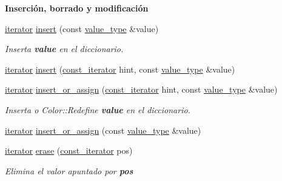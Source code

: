 \begin{Indent}\textbf{ Inserción, borrado y modificación}\par
\begin{DoxyCompactItemize}
\item 
\hyperlink{classaed2_1_1map_1_1iterator}{iterator} \hyperlink{classaed2_1_1map_a60aacba06b1579630b3c8e996cf248c8_a60aacba06b1579630b3c8e996cf248c8}{insert} (const \hyperlink{classaed2_1_1map_a719db98e0ff9a837610f76be33264680_a719db98e0ff9a837610f76be33264680}{value\+\_\+type} \&value)
\begin{DoxyCompactList}\small\item\em Inserta {\bfseries value} en el diccionario. \end{DoxyCompactList}\item 
\hyperlink{classaed2_1_1map_1_1iterator}{iterator} \hyperlink{classaed2_1_1map_a6941cde9a79c27f054b5c97a587a1854_a6941cde9a79c27f054b5c97a587a1854}{insert} (\hyperlink{classaed2_1_1map_1_1const__iterator}{const\+\_\+iterator} hint, const \hyperlink{classaed2_1_1map_a719db98e0ff9a837610f76be33264680_a719db98e0ff9a837610f76be33264680}{value\+\_\+type} \&value)
\item 
\hyperlink{classaed2_1_1map_1_1iterator}{iterator} \hyperlink{classaed2_1_1map_a2ef6723c183916276b0afc4a4c721475_a2ef6723c183916276b0afc4a4c721475}{insert\+\_\+or\+\_\+assign} (\hyperlink{classaed2_1_1map_1_1const__iterator}{const\+\_\+iterator} hint, const \hyperlink{classaed2_1_1map_a719db98e0ff9a837610f76be33264680_a719db98e0ff9a837610f76be33264680}{value\+\_\+type} \&value)
\begin{DoxyCompactList}\small\item\em Inserta o Color\+::\+Redefine {\bfseries value} en el diccionario. \end{DoxyCompactList}\item 
\hyperlink{classaed2_1_1map_1_1iterator}{iterator} \hyperlink{classaed2_1_1map_a9128a806713bcc999ebd8a97ab77e765_a9128a806713bcc999ebd8a97ab77e765}{insert\+\_\+or\+\_\+assign} (const \hyperlink{classaed2_1_1map_a719db98e0ff9a837610f76be33264680_a719db98e0ff9a837610f76be33264680}{value\+\_\+type} \&value)
\item 
\hyperlink{classaed2_1_1map_1_1iterator}{iterator} \hyperlink{classaed2_1_1map_ad8e796bf9c9c558e5ce6b61e116253fe_ad8e796bf9c9c558e5ce6b61e116253fe}{erase} (\hyperlink{classaed2_1_1map_1_1const__iterator}{const\+\_\+iterator} pos)
\begin{DoxyCompactList}\small\item\em Elimina el valor apuntado por {\bfseries pos} \end{DoxyCompactList}\item 

\end{DoxyCompactItemize}
\end{Indent}
